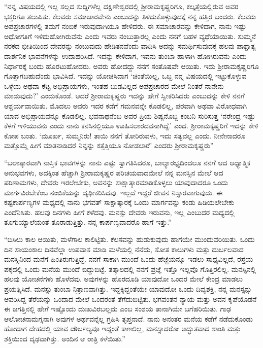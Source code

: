 “ನನ್ನ ವಿಷಯದಲ್ಲಿ ಇಲ್ಲ ಸಲ್ಲದ ಸುದ್ದಿಗಳೆಲ್ಲ ದಕ್ಷಿಣೇಶ್ವರದಲ್ಲಿ ಶ‍್ರೀರಾಮಕೃಷ್ಣರಿಗೂ, ಕಲ್ಕತ್ತೆಯಲ್ಲಿರುವ ಅವರ ಭಕ್ತರಿಗೂ ತಲುಪಿತು. ಕೆಲವರು ಸಮಾಚಾರವೇನು ಎಂಬುದನ್ನು ತಿಳಿದುಕೊಳ್ಳುವುದಕ್ಕೆ ನನ್ನ ಹತ್ತಿರ ಬಂದರು. ಕೆಲವರು ಅಪಪ್ರಚಾರಗಳಲ್ಲಿ ತಮಗೆ ನಂಬಿಕೆ ಇರುವುದಾಗಿಯೂ ಹೇಳಿದರು. ಈ ಸಮಾಚಾರವನ್ನು ಕೇಳಿದಾಗ, ನಾನು ಇಷ್ಟು ಅಧೋಗತಿಗೆ ಇಳಿದುಹೋಗಿರುವೆನು ಎಂದು ಇವರು ನಂಬುತ್ತಾರಲ್ಲ ಎಂದು ನನಗೆ ಬಹಳ ವ್ಯಥೆಯಾಯಿತು. ಸುಮ್ಮನೆ ನರಕದ ಭೀತಿಯಿಂದ ದೇವರನ್ನು ನಂಬುವುದು ಹೇಡಿತನವೆಂದು ವಾದಿಸಿ ಅದನ್ನು ಸಮರ್ಥಿಸುವುದಕ್ಕೆ ಹಲವು ಪಾಶ್ಚಾತ್ಯ ದಾರ್ಶನಿಕ ಭಾವನೆಗಳನ್ನು ಉದಾಹರಿಸಿದೆ. ಇದನ್ನು ಕೇಳಿದಾಗ, ಇವನು ತುಂಬಾ ಹಾಳಾಗಿ ಹೋಗಿರುವನು ಎಂದು ನಿರ್ಧಾರಕ್ಕೆ ಬಂದು ಹೊರಟುಹೋದರು. ಅವರು ಹೋದದ್ದು ನನಗೆ ಸಂತೊಷವೇ ಆಯಿತು. ಇದು ಶ‍್ರೀರಾಮಕೃಷ್ಣರಿಗೂ ಗೊತ್ತಾಗಬಹುದೆಂದು ಭಾವಿಸಿದೆ. ಇದನ್ನು ಯೋಚಿಸಿದಾಗ ‘ಚಿಂತೆಯಿಲ್ಲ, ಒಬ್ಬ ನನ್ನ ವಿಷಯದಲ್ಲಿ ಇಟ್ಟುಕೊಳ್ಳುವ ಒಳ್ಳೆಯ ಅಥವಾ ಕೆಟ್ಟ ಅಭಿಪ್ರಾಯಗಳು, ಇಂತಹ ಬುಡವಿಲ್ಲದ ಅಪಪ್ರಚಾರದ ಮೇಲೆ ನಿಂತರೆ ನಾನೇನು ಮಾಡುವುದು?’ ಎಂದುಕೊಂಡೆ. ಆದರೆ ಶ‍್ರೀರಾಮಕೃಷ್ಣರು ಇದನ್ನು ಹೇಗೆ ಸ್ವೀಕರಿಸಿದರು ಎಂಬುದನ್ನು ಕೇಳಿ ನನಗೆ ಆಶ್ಚರ್ಯವಾಯಿತು. ಮೊದಲು ಅವರು ಇದರ ಕಡೆಗೆ ಗಮನವನ್ನೇ ಕೊಡಲಿಲ್ಲ, ಪರವಾಗಿ ಅಥವಾ ವಿರೋಧವಾಗಿ ಯಾವ ಅಭಿಪ್ರಾಯವನ್ನೂ ಕೊಡಲಿಲ್ಲ. ಭವನಾಥನೆಂಬ ಅವರ ಪ್ರಿಯ ಶಿಷ್ಯನೊಬ್ಬ ಕಂಬನಿ ಸುರಿಸುತ್ತ ‘ನರೇಂದ್ರ ಇಷ್ಟು ಕೆಳಗೆ ಇಳಿಯುವನು ಎಂದು ನಾನು ಕನಸಿನಲ್ಲಿಯೂ ಊಹಿಸಲಾರದವನಾಗಿದ್ದೆ.’ ಎಂದ. ಶ‍್ರೀರಾಮಕೃಷ್ಣರಿಗೆ ಇದನ್ನು ಕೇಳಿ ಕೋಪ ಬಂತು. ‘ಮೂರ್ಖ, ಸುಮ್ಮನಿರು! ತಾಯಿ ನನಗೆ ತೋರಿರುವಳು, ಇದು ಸತ್ಯವಲ್ಲ ಎಂದು. ನೀನೇನಾದರೂ ಮತ್ತೊಮ್ಮೆ ಹೀಗೆ ಮಾತನಾಡಿದರೆ ನಿನ್ನನ್ನು ಕತ್ತೆತ್ತಿಯೂ ನೋಡಲಾರೆ’ ಎಂದರು ಶ‍್ರೀರಾಮಕೃಷ್ಣರು”

“ಬಲಾತ್ಕಾರವಾಗಿ ನಾಸ್ತಿಕ ಭಾವಗಳನ್ನು ನಾನು ಎಷ್ಟು ಸ್ವಾಗತಿಸಿದರೂ, ಬಾಲ್ಯಾರಭ್ಯದಿಂದಲೂ ನನಗೆ ಆದ ಆಧ್ಯಾತ್ಮಿಕ ಅನುಭವಗಳು, ಅದಕ್ಕಿಂತ ಹೆಚ್ಚಾಗಿ ಶ‍್ರೀರಾಮಕೃಷ್ಣರ ಪರಿಚಯವಾದಮೇಲೆ ನನ್ನ ಮನಸ್ಸಿನ ಮೇಲೆ ಆದ ಪರಿಣಾಮಗಳು, ದೇವರು ಇರಲೇಬೇಕು, ಅವನನ್ನು ಸಾಕ್ಷಾತ್ಕಾರಮಾಡಿಕೊಳ್ಳಲು ಯಾವುದಾದರೂ ಒಂದು ಮಾರ್ಗವಿರಬೇಕೆಂಬ ನಂಬಿಕೆಯನ್ನು ದೃಢೀಕರಿಸಿದವು. ಇಲ್ಲದೆ ಇದ್ದರೆ ಜೀವನ ನಿಸ್ಸಾರವಾಗುವುದು. ಈ ಕಷ್ಟಕಾರ್ಪಣ್ಯಗಳ ಮಧ್ಯದಲ್ಲಿ ನಾನು ಭಗವತ್ ಸಾಕ್ಷಾತ್ಕಾರಕ್ಕೆ ಒಂದು ಮಾರ್ಗವನ್ನು ಕಂಡು ಹಿಡಿಯಲೇಬೇಕು ಎಂದೆನಿಸಿತು. ಹಲವು ದಿನಗಳು ಹೀಗೆ ಕಳೆದವು. ಮನಸ್ಸು ದೇವರು ಇರುವನು, ಇಲ್ಲ ಎಂಬುದರ ಮಧ್ಯದಲ್ಲಿ ತೂಗುಯ್ಯಾಲೆಯಂತೆ ತೂರಾಡುತ್ತಿತ್ತು. ನನ್ನ ಕಾರ್ಪಣ್ಯವಾದರೊ ಹಾಗೆ ಇತ್ತು.”

“ಬಿಸಿಲು ಕಾಲ ಆಯಿತು, ಮಳೆಗಾಲ ಕಾಲಿಟ್ಟಿತು. ಕೆಲಸವನ್ನು ಹುಡುಕುವುದು ಹಾಗೆಯೇ ಮುಂದುವರಿಯಿತು. ಒಂದು ದಿನ ಸಾಯಂಕಾಲ ದಿನವೆಲ್ಲಾ ಉಪವಾಸ ಮಾಡಿ ಮಳೆಯಲ್ಲಿ ನೆನೆದು, ಸೋತ ಕಾಲುಗಳು ಮತ್ತು ದುರ್ಬಲವಾದ ಮನಸ್ಸಿನಿಂದ ಮನೆಗೆ ಹಿಂತಿರುಗುತ್ತಿದ್ದೆ. ನನಗೆ ಸಾಕಾಗಿ ಮುಂದೆ ಒಂದು ಹೆಜ್ಜೆಯನ್ನೂ ಇಡಲು ಸಾಧ್ಯವಿಲ್ಲದೆ, ರಸ್ತೆಯ ಪಕ್ಕದಲ್ಲಿ ಒಂದು ಮನೆಯ ಮುಂದೆ ಬಿದ್ದುಬಿಟ್ಟೆ. ತತ್ಕಾಲದಲ್ಲಿ ನನಗೆ ಪ್ರಜ್ಞೆ ಇತ್ತೊ ಇಲ್ಲವೊ ಗೊತ್ತಿರಲಿಲ್ಲ. ಮನಸ್ಸಿನಲ್ಲಿ ಹಲವು ಯೋಚನೆಗಳು ಹೊಳೆದವು. ಅವುಗಳನ್ನು ಹೊರದೂಡಿ ಯಾವುದೋ ಒಂದರ ಮೇಲೆ ಕೇಂದ್ರ ಮಾಡಲು ಪ್ರಯತ್ನಿಸಿದೆ. ಮನಸ್ಸು ತುಂಬಾ ನಿತ್ರಾಣವಾಗಿತ್ತು. ಇದ್ದಕ್ಕಿದ್ದಂತೆಯೇ ಯಾವುದೋ ಒಂದು ದಿವ್ಯಶಕ್ತಿ, ನನ್ನ ಮನಸ್ಸನ್ನು ಆವರಿಸಿದ್ದ ತೆರೆಯನ್ನು ಒಂದಾದ ಮೇಲೆ ಒಂದರಂತೆ ತೆಗೆದುಬಿಟ್ಟಿತು. ಭಗವಂತನ ನ್ಯಾಯ ಮತ್ತು ಅವನ ಕೃಪೆಯೊಡನೆ ಈ ಜಗತ್ತಿನಲ್ಲಿ ಹೇಗೆ ಇಷ್ಟೊಂದು ದುಃಖವಿರಬಲ್ಲದು ಎಂಬ ಸಂಶಯ ತಾನಾಗಿಯೇ ಬಗೆಹರಿಯಿತು. ಗಾಢ ಆಲೋಚನಾಮಗ್ನನಾಗಿ ಅವುಗಳ ಅರ್ಥವನ್ನೆಲ್ಲ ಗ್ರಹಿಸಿ ತೃಪ್ತನಾದೆ. ನಾನು ಅನಂತರ ಮನೆಯ ಕಡೆಗೆ ನಡೆದುಕೊಂಡು ಹೋದಾಗ ದೇಹದಲ್ಲಿ ಯಾವ ದೌರ್ಬಲ್ಯವೂ ಇದ್ದಂತೆ ಕಾಣಲಿಲ್ಲ, ಮನಸ್ಸಾದರೋ ಅದ್ಭುತವಾದ ಶಾಂತಿ ಮತ್ತು ಶಕ್ತಿಯಿಂದ ದೃಢವಾಗಿತ್ತು. ಅಂದಿನ ಆ ರಾತ್ರಿ ಕಳೆಯಿತು.”

